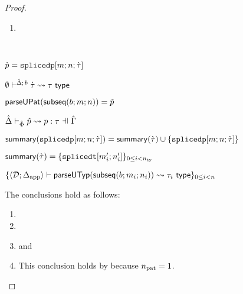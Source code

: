 \begin{grayparbox}
\begin{proof}
\begin{byCases}
\begin{enumerate}
    \item {}
    \end{enumerate}
    \resetpfcounter
  \item[\text{(\ref{rule:cvalidP-UP-spliced})}] ~
    \begin{pfsteps*}
      \item $\grave{p}=\texttt{splicedp}[m; n; \grave{\tau}]$ 
      \item $\emptyset\vdash^{\hat{\Delta};\,b} \grave{\tau} \leadsto \tau~\mathsf{type}$  
      \item $\mathsf{parseUPat}(\mathsf{subseq}(b; m; n))=\hat{p}$  
      \item $\patExpands{\upctx}{\uPhi}{\upv}{p}{\tau}$  
      \item $\mathsf{summary}(\texttt{splicedp}[m; n; \grave{\tau}]) = \mathsf{summary}(\grave{\tau}) \cup \{ \texttt{splicedp}[m; n; \grave{\tau}] \}$  
      \item $\mathsf{summary}(\grave{\tau}) = \{\texttt{splicedt}[m'_i; n'_i]\}_{0 \leq i < n_\text{ty}}$  
      \item $\{\langle \mathcal{D}; \Delta_\text{app} \rangle \vdash 
  \mathsf{parseUTyp}(\mathsf{subseq}(b; m_i; n_i))
 \leadsto \tau_i~\mathsf{type}\}_{0 \leq i < n}$  
    \end{pfsteps*}
    The conclusions hold as follows:
    \begin{enumerate}
      \item {}
      \item {}
      \item {} and 
      \item This conclusion holds by  because $n_\text{pat}=1$.
    \end{enumerate}
    \resetpfcounter
\end{byCases}
\end{proof}


\end{grayparbox}
